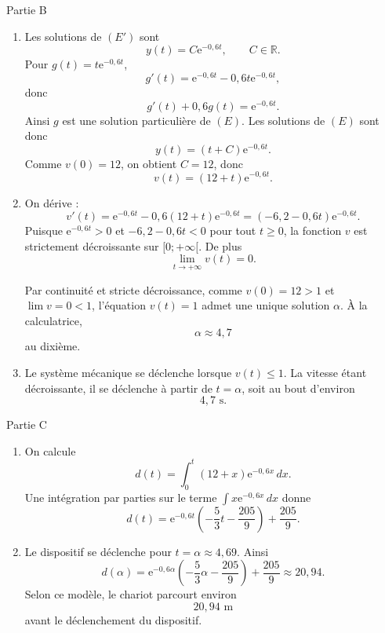 \documentclass[11pt,a4paper]{article}
\newcommand{\e}{\mathrm e}
\begin{document}
\begin{correctionbox}{Partie B}
\begin{enumerate}
\item Les solutions de $(E')$ sont
\[
y(t)=C\e^{-0{,}6t},\qquad C\in\mathbb R.
\]
Pour $g(t)=t\e^{-0{,}6t}$,
\[
g'(t)=\e^{-0{,}6t}-0{,}6t\e^{-0{,}6t},
\]
donc
\[
g'(t)+0{,}6g(t)=\e^{-0{,}6t}.
\]
Ainsi $g$ est une solution particulière de $(E)$.
Les solutions de $(E)$ sont donc
\[
y(t)=(t+C)\e^{-0{,}6t}.
\]
Comme $v(0)=12$, on obtient $C=12$, donc
\[
v(t)=(12+t)\e^{-0{,}6t}.
\]

\item On dérive :
\[
v'(t)=\e^{-0{,}6t}-0{,}6(12+t)\e^{-0{,}6t}=(-6{,}2-0{,}6t)\e^{-0{,}6t}.
\]
Puisque $\e^{-0{,}6t}>0$ et $-6{,}2-0{,}6t<0$ pour tout $t\geqslant0$, la fonction $v$ est strictement décroissante sur $[0;+\infty[$.
De plus
\[
\lim_{t\to+\infty}v(t)=0.
\]

\begin{center}
\end{center}

Par continuité et stricte décroissance, comme $v(0)=12>1$ et $\lim v=0<1$, l'équation $v(t)=1$ admet une unique solution $\alpha$. À la calculatrice,
\[
\alpha\approx4{,}7
\]
au dixième.

\item Le système mécanique se déclenche lorsque $v(t)\leqslant1$. La vitesse étant décroissante, il se déclenche à partir de $t=\alpha$, soit au bout d'environ
\[
\boxed{4{,}7\text{ s}}.
\]
\end{enumerate}
\end{correctionbox}

\begin{correctionbox}{Partie C}
\begin{enumerate}
\item On calcule
\[
d(t)=\int_0^t (12+x)\e^{-0{,}6x}\,dx.
\]
Une intégration par parties sur le terme $\int x\e^{-0{,}6x}\,dx$ donne
\[
d(t)=\e^{-0{,}6t}\left(-\dfrac53t-\dfrac{205}{9}\right)+\dfrac{205}{9}.
\]

\item Le dispositif se déclenche pour $t=\alpha\approx4{,}69$. Ainsi
\[
d(\alpha)=\e^{-0{,}6\alpha}\left(-\dfrac53\alpha-\dfrac{205}{9}\right)+\dfrac{205}{9}
\approx20{,}94.
\]
Selon ce modèle, le chariot parcourt environ
\[
\boxed{20{,}94\text{ m}}
\]
avant le déclenchement du dispositif.
\end{enumerate}
\end{correctionbox}
\end{document}
